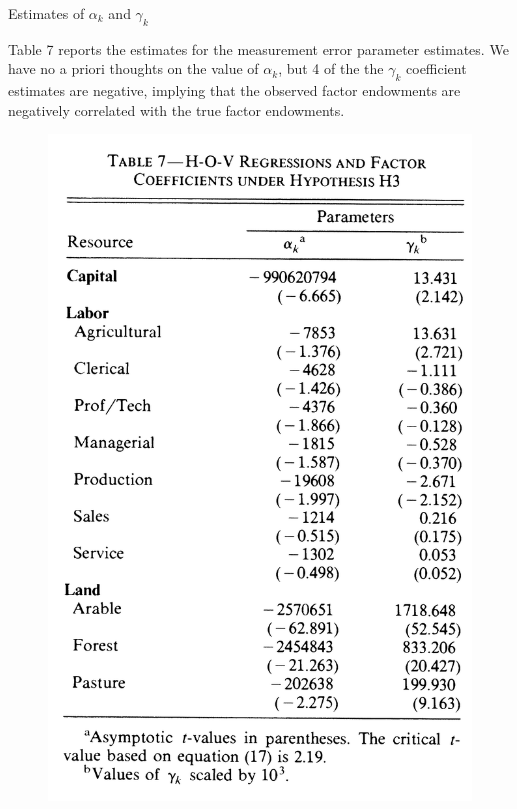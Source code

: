 \documentclass[aspectratio=169]{beamer}
\begin{document}

\begin{frame}{Estimates of $ \alpha_k $ and $ \gamma_k $}

Table 7 reports the estimates for the measurement error parameter estimates.  We have no a priori thoughts on the value of $ \alpha_k $, but 4 of the the $ \gamma_k $ coefficient estimates are negative, implying that the observed factor endowments are negatively correlated with the true factor endowments.

\begin{figure}
    \centering
    \includegraphics[scale = 0.45]{Table 7.png}
    \label{fig:Table7}
\end{figure} 
    
\end{frame}

\end{document}

